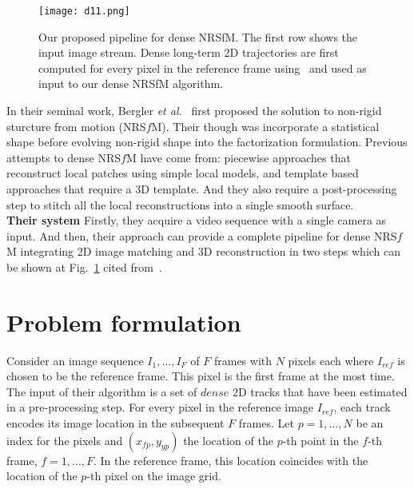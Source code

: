 \documentclass[10pt,twocolumn,letterpaper]{article}
\begin{document}
\begin{figure}
\begin{center}
\texttt{[image: d11.png]}
\end{center}
\caption{Our proposed pipeline for dense NRSfM. The first row shows the input image stream. Dense long-term 2D trajectories are first computed for every pixel in the reference frame using~\cite{A} and used as input to our dense NRSfM algorithm.}
\label{fig}
\end{figure}

In their seminal work, Bergler \emph{et al.}~\cite{Recovering} first proposed the solution to non-rigid sturcture from motion (NRS$f$M). Their though was incorporate a statistical shape before evolving non-rigid shape into the factorization formulation. Previous attempts to dense NRS$f$M have come from: piecewise approaches that reconstruct local patches using simple local models, and template based approaches that require a 3D template. And they also require a post-processing step to stitch all the local reconstructions into a single smooth surface.\\
{\bf Their system} Firstly, they acquire a video sequence with a single camera as input. And then, their approach can provide a complete pipeline for dense NRS$f$M integrating 2D image matching and 3D reconstruction in two steps which can be shown at Fig.~\ref{fig} cited from~\cite{dense}.

\balance

\section{Problem formulation}

Consider an image sequence $I_1,\dots,I_F$ of $F$ frames with $N$ pixels each where $I_{ref}$ is chosen to be the reference frame. This pixel is the first frame at the most time. The input of their algorithm is a set of $dense$ 2D tracks that have been estimated in a pre-processing step. For every pixel in the reference image $I_{ref}$, each track encodes its image location in the subsequent $F$ frames. Let $p = 1,\dots,N$ be an index for the pixels and $(x_{fp},y_{yp})$ the location of the $p$-th point in the $f$-th frame, $f = 1,\dots,F$. In the reference frame, this location coincides with the location of the $p$-th pixel on the image grid.
\end{document}
